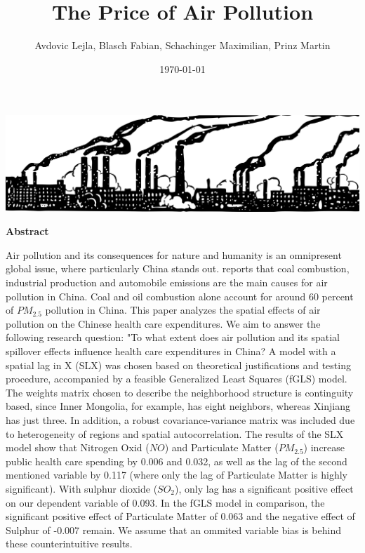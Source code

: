 \documentclass[
]{article}
\title{The Price of Air Pollution}
\author{Avdovic Lejla, Blasch Fabian, Schachinger Maximilian, Prinz Martin}
\date{\today}
\begin{document}
	\maketitle

	\begin{center}
		\includegraphics[width = 380pt]{pollution.png}
	\end{center}
	\thispagestyle{empty}
	\vspace*{30pt}
	\begin{center}
		\textbf{Abstract}
	\end{center}
	Air pollution and its consequences for nature and humanity is an omnipresent global issue, where particularly China stands out. \cite{rasch_under_nodate} reports that coal combustion, industrial production
	and automobile emissions are the main causes for
	air pollution in China. Coal and oil combustion alone account for around 60 percent of $PM_2.5$ pollution in China.
	This paper analyzes the spatial effects of air pollution on the Chinese health care expenditures. We aim to answer the following research question: "To what extent does air pollution and its spatial spillover effects influence health care expenditures in China? A model with a spatial lag in X (SLX) was chosen based on theoretical justifications and testing procedure, accompanied by a feasible Generalized Least Squares (fGLS) model.
	The weights matrix chosen to describe the neighborhood structure is continguity based, since Inner Mongolia, for example, has eight neighbors, whereas Xinjiang has just three.
	In addition, a robust covariance-variance matrix was included due to heterogeneity of regions and spatial autocorrelation. The results of the SLX model show that Nitrogen Oxid ($NO$) and Particulate Matter ($PM_{2.5}$)
	increase public health care spending by 0.006 and 0.032, as well as the lag of the second mentioned variable by 0.117 (where only the lag of Particulate Matter is highly significant). With sulphur dioxide ($SO_2$), only lag has a significant positive effect on our dependent variable of 0.093. In the fGLS model in comparison, the significant positive effect of Particulate Matter of 0.063 and the negative effect of Sulphur of -0.007 remain. We assume that an ommited variable bias is behind these counterintuitive results.
\end{document}

